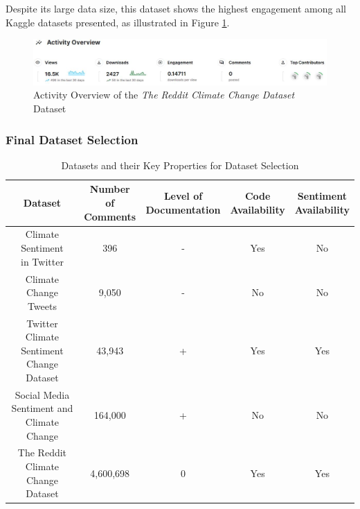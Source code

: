 Despite its large data size, this dataset shows the highest engagement among all Kaggle datasets presented, as illustrated in Figure \ref{fig:ds_5_activity}.

\begin{figure}[h]
    \includegraphics[width=\textwidth]{images/dataset/ds_5_activity.JPG}
    \caption{Activity Overview of the \emph{The Reddit Climate Change Dataset} Dataset\protect\footnotemark}
    \label{fig:ds_5_activity}
\end{figure}

\subsubsection{Final Dataset Selection}
\begin{table}[h!]
    \centering
    \begin{tabular}{c c c c c}
    \toprule
    \textbf{Dataset} & \makecell{\textbf{Number of} \\ \textbf{Comments}} & \makecell{\textbf{Level of} \\ \textbf{Documentation}} & \makecell{\textbf{Code} \\ \textbf{Availability}} & \makecell{\textbf{Sentiment} \\ \textbf{Availability}} \\
    \midrule
    \makecell{Climate Sentiment \\ in Twitter} & 396 & - & Yes & No \\
    \hline
    \makecell{Climate Change \\ Tweets} & 9,050 & - & No & No \\
    \hline
    \makecell{Twitter Climate \\ Sentiment Change \\ Dataset} & 43,943 & + & Yes & Yes \\
    \hline
    \makecell{Social Media \\ Sentiment and \\ Climate Change} & 164,000 & + & No & No \\
    \hline
    \makecell{The Reddit Climate \\ Change Dataset} & 4,600,698 & 0 & Yes & Yes \\
    \bottomrule
    \end{tabular}
    \caption{Datasets and their Key Properties for Dataset Selection}
    \label{table:datasets}
\end{table}

